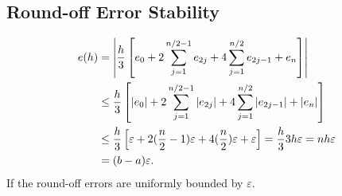 \subsection{Round-off Error Stability}
\begin{align*}
    e(h) &= \left|\frac{h}{3}\left[e_0+2\sum_{j=1}^{n/2-1}e_{2j}+4\sum_{j=1}^{n/2}e_{2j-1}+e_n\right]\right| \\
    &\leq \frac{h}{3}\left[\left|e_0\right|+2\sum_{j=1}^{n/2-1}\left|e_{2j}\right|+4\sum_{j=1}^{n/2}\left|e_{2j-1}\right|+\left|e_n\right|\right] \\
    &\leq \frac{h}{3}\left[\varepsilon+2(\frac{n}{2}-1)\varepsilon+4(\frac{n}{2})\varepsilon+\varepsilon\right]=\frac{h}{3}3h\varepsilon = nh\varepsilon \\
    &= (b-a)\varepsilon.
\end{align*}
If the round-off errors are uniformly bounded by $\varepsilon$.